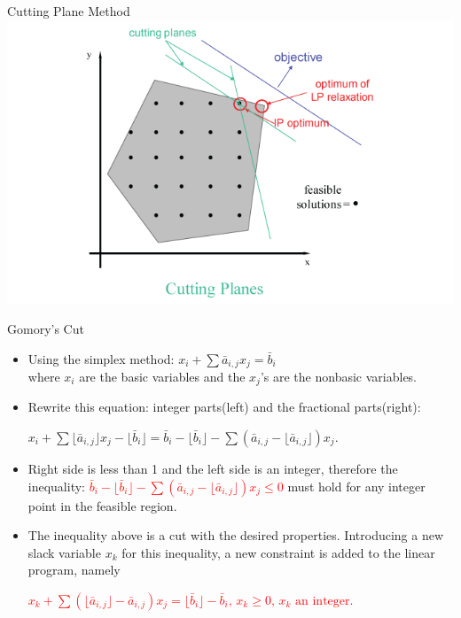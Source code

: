     \begin{frame}{Cutting Plane Method}
      \centering
      \includegraphics[width = 1\textwidth]{images/CP.png}
    \end{frame}

    \begin{frame}{Gomory's Cut}
      \begin{itemize}

      \item Using the simplex method:
      $x_{i}+\sum{\bar {a}}_{i,j}x_{j}={\bar {b}}_{i}$ \\

      where $x_i$ are the basic variables and the $x_j$'s are the nonbasic variables.

      \item Rewrite this equation: integer parts(left) and the fractional parts(right):

      $x_{i}+\sum \lfloor {\bar {a}}_{i,j}\rfloor x_{j}-\lfloor {\bar {b}}_{i}\rfloor ={\bar {b}}_{i}-\lfloor {\bar {b}}_{i}\rfloor -\sum ({\bar {a}}_{i,j}-\lfloor {\bar {a}}_{i,j}\rfloor )x_{j}.$ \\

      \item Right side is less than 1 and the left side is an integer, therefore the inequality:
      \textcolor{red}{${\bar {b}}_{i}-\lfloor {\bar {b}}_{i}\rfloor -\sum ({\bar {a}}_{i,j}-\lfloor {\bar {a}}_{i,j}\rfloor )x_{j}\leq 0 $}
      must hold for any integer point in the feasible region.

      \item The inequality above is a cut with the desired properties. Introducing a new slack variable $x_k$ for this inequality, a new constraint is added to the linear program, namely

      \textcolor{red}{$x_{k}+\sum (\lfloor {\bar {a}}_{i,j}\rfloor -{\bar {a}}_{i,j})x_{j}=\lfloor {\bar {b}}_{i}\rfloor -{\bar {b}}_{i},\,x_{k}\geq 0,\,x_{k}{\mbox{ an integer}}$.}
      \end{itemize}
    \end{frame}

